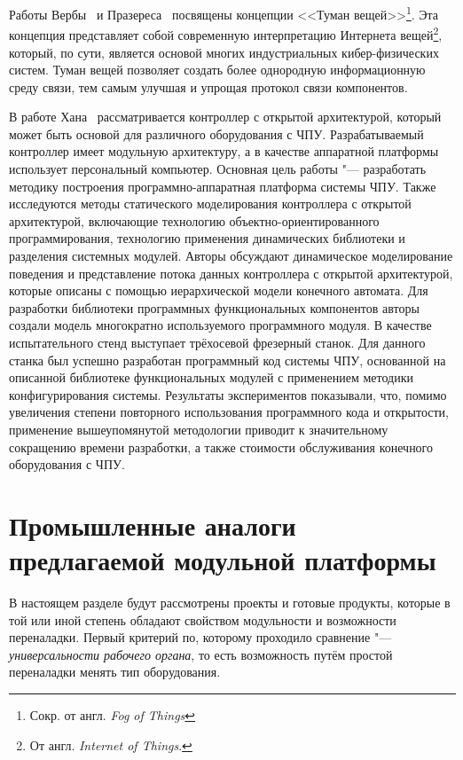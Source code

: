 Работы Вербы~\cite{Verba2016} и Празереса~\cite{Prazeres7471301} посвящены концепции <<Туман вещей>>\footnote{Сокр. от англ. \textit{Fog of Things}}. Эта концепция представляет собой современную интерпретацию Интернета вещей\footnote{От англ. \textit{Internet of Things}.}, который, по сути, является основой многих индустриальных кибер-физических систем. Туман вещей позволяет создать более однородную информационную среду связи, тем самым улучшая и упрощая протокол связи компонентов.

В работе Хана~\cite{han2007development} рассматривается контроллер с открытой архитектурой, который может быть основой для различного оборудования с ЧПУ. Разрабатываемый контроллер имеет модульную архитектуру, а в качестве аппаратной  платформы использует персональный компьютер. Основная цель работы "--- разработать методику построения программно-аппаратная платформа системы ЧПУ. Также исследуются методы статического моделирования контроллера с открытой архитектурой, включающие технологию объектно-ориентированного программирования, технологию применения динамических библиотеки и разделения  системных модулей. Авторы обсуждают динамическое моделирование поведения  и представление потока данных контроллера с открытой архитектурой, которые  описаны с помощью иерархической модели конечного автомата. Для разработки  библиотеки программных функциональных компонентов авторы создали модель  многократно используемого программного модуля. В качестве испытательного  стенд выступает трёхосевой фрезерный станок. Для данного станка был успешно  разработан программный код системы ЧПУ, основанной на описанной библиотеке функциональных модулей с применением методики конфигурирования  системы. Результаты экспериментов показывали, что, помимо увеличения степени повторного использования программного кода и открытости, применение  вышеупомянутой методологии приводит к значительному сокращению времени  разработки, а также стоимости обслуживания конечного оборудования с ЧПУ.

\section{Промышленные аналоги предлагаемой модульной платформы}\label{sec:ch1/industrial-examples}


В настоящем разделе будут рассмотрены проекты и готовые продукты, которые в той или иной степень обладают свойством модульности и возможности переналадки. Первый критерий по, которому проходило сравнение "--- \textit{универсальности рабочего органа}, то есть возможность путём простой переналадки менять тип оборудования. 

